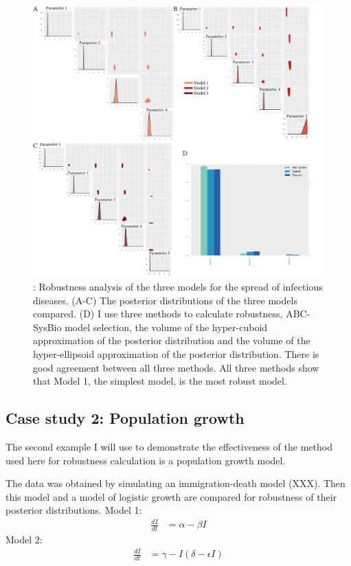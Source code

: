 {\begin{figure}[p]
\begin{center}
\includegraphics[width=\textwidth]{chapterStabilityFinder/images/ex1_sum.png}
\caption[LoF caption]{\label{fig:rob_sysbio1}: Robustness analysis of the three models for the spread of infectious diseases. (A-C) The posterior distributions of the three models compared. (D) I use three methods to calculate robustness, ABC-SysBio model selection, the volume of the hyper-cuboid approximation of the posterior distribution and the volume of the hyper-ellipsoid approximation of the posterior distribution. There is good agreement between all three methods. All three methods show that Model 1, the simplest model, is the most robust model. }

\end{center}
\end{figure}
\clearpage

\subsection{Case study 2: Population growth}

The second example I will use to demonstrate the effectiveness of the method used here for robustness calculation is a population growth model.

The data was obtained by simulating an immigration-death model (XXX). Then this model and a model of logistic growth are compared for robustness of their posterior distributions. 
Model 1:
\begin{align*}
  \frac{dI}{dt} &= \alpha - \beta I
\end{align*}
Model 2:
\begin{align*}
  \frac{dI}{dt} &= \gamma - I	(\delta - \epsilon I)
\end{align*}


}
